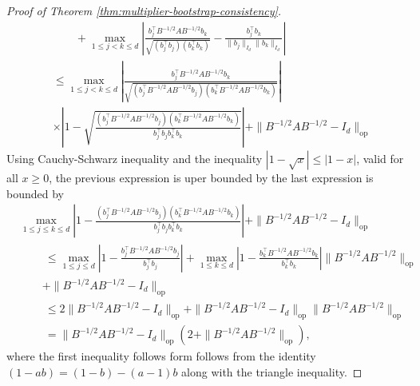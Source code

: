 \documentclass[11pt]{article}
\begin{document}
\begin{appendices}
\begin{proof}[Proof of Theorem \ref{thm:multiplier-bootstrap-consistency}]
\begin{align*}
&\qquad+ \max_{1\le j < k\le d}\left|\frac{b_j^{\top}B^{-1/2}AB^{-1/2}b_k}{\sqrt{(b_j^{\top}b_j)(b_k^{\top}b_k)}} - \frac{b_j^{\top}b_k}{\|b_j\|_{I_d}\|b_k\|_{I_d}}\right|\\
&\le \max_{1\le j < k\le d}\left|\frac{b_j^{\top}B^{-1/2}AB^{-1/2}b_k}{\sqrt{(b_j^{\top}B^{-1/2}AB^{-1/2}b_j)(b_k^{\top}B^{-1/2}AB^{-1/2}b_k)}}\right|\\
& \times\left|1 - \sqrt{\frac{(b_j^{\top}B^{-1/2}AB^{-1/2}b_j)(b_k^{\top}B^{-1/2}AB^{-1/2}b_k)}{b_j^{\top}b_jb_k^{\top}b_k}}\right|+ \|B^{-1/2}AB^{-1/2} - I_d\|_{\mathrm{op}}
\end{align*}
Using Cauchy-Schwarz inequality and the inequality $|1 - \sqrt{x}| \le |1 - x|$, valid for all $x \geq 0$, the previous expression is uper bounded by  the last expression is bounded by
\begin{align*}
&  \max_{1\le j \le k\le d}\left|1 - \frac{(b_j^{\top}B^{-1/2}AB^{-1/2}b_j)(b_k^{\top}B^{-1/2}AB^{-1/2}b_k)}{b_j^{\top}b_jb_k^{\top}b_k}\right| + \|B^{-1/2}AB^{-1/2} - I_d\|_{\mathrm{op}}\\
&\qquad~ \le \max_{1\le j\le d}\left|1 - \frac{b_j^{\top}B^{-1/2}AB^{-1/2}b_j}{b_j^{\top}b_j}\right| + \max_{1\le k\le d}\left|1 - \frac{b_k^{\top}B^{-1/2}AB^{-1/2}b_k}{b_k^{\top}b_k}\right|\|B^{-1/2}AB^{-1/2}\|_{\mathrm{op}}\\ &\qquad+ \|B^{-1/2}AB^{-1/2} - I_d\|_{\mathrm{op}}\\
&\qquad~ \le 2\|B^{-1/2}AB^{-1/2} - I_d\|_{\mathrm{op}} + \|B^{-1/2}AB^{-1/2} - I_d\|_{\mathrm{op}}\|B^{-1/2}AB^{-1/2}\|_{\mathrm{op}}\\
&\qquad~ = \|B^{-1/2}AB^{-1/2} - I_d\|_{\mathrm{op}}\left(2 + \|B^{-1/2}AB^{-1/2}\|_{\mathrm{op}}\right),
\end{align*}
where the first inequality follows form follows from the identity $(1 - ab) = (1 - b) - (a-1)b$ along with the triangle inequality.


\end{proof}
\end{appendices}
\end{document}
